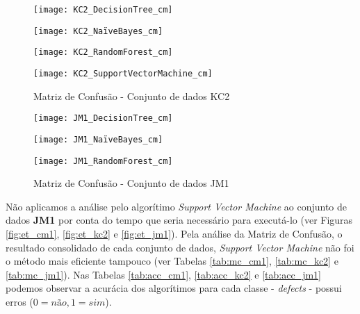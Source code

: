 \documentclass[10pt]{article}
\begin{document}
    \begin{figure}
        \centering
        \begin{minipage}{0.25\textwidth}
            \centering
            \texttt{[image: KC2\_DecisionTree\_cm]}
        \end{minipage}\hfill
        \begin{minipage}{0.25\textwidth}
            \centering
            \texttt{[image: KC2\_NaïveBayes\_cm]}
        \end{minipage}\hfill
        \begin{minipage}{0.25\textwidth}
            \centering
            \texttt{[image: KC2\_RandomForest\_cm]}
        \end{minipage}\hfill
        \begin{minipage}{0.25\textwidth}
            \centering
            \texttt{[image: KC2\_SupportVectorMachine\_cm]}
        \end{minipage}\hfill
        \caption{Matriz de Confusão - Conjunto de dados KC2}\label{fig:mc_kc2}
    \end{figure}

    \begin{figure}
        \centering
        \begin{minipage}{0.25\textwidth}
            \centering
            \texttt{[image: JM1\_DecisionTree\_cm]}
        \end{minipage}\hfill
        \begin{minipage}{0.25\textwidth}
            \centering
            \texttt{[image: JM1\_NaïveBayes\_cm]}
        \end{minipage}\hfill
        \begin{minipage}{0.25\textwidth}
            \centering
            \texttt{[image: JM1\_RandomForest\_cm]}
        \end{minipage}\hfill
        \begin{minipage}{0.25\textwidth}
            \hspace{\fill}
        \end{minipage}\hfill
        \caption{Matriz de Confusão - Conjunto de dados JM1}\label{fig:mc_jm1}
    \end{figure}

    Não aplicamos a análise pelo algorítimo \textit{Support Vector Machine} ao conjunto de dados \textbf{JM1} por conta do tempo que seria necessário para executá-lo (ver Figuras \ref{fig:et_cm1}, \ref{fig:et_kc2} e \ref{fig:et_jm1}). Pela análise da Matriz de Confusão, o resultado consolidado de cada conjunto de dados, \textit{Support Vector Machine} não foi o método mais eficiente tampouco (ver Tabelas \ref{tab:mc_cm1}, \ref{tab:mc_kc2} e \ref{tab:mc_jm1}). Nas Tabelas \ref{tab:acc_cm1}, \ref{tab:acc_kc2} e \ref{tab:acc_jm1} podemos observar a acurácia dos algorítimos para cada classe - \textit{defects} - possui erros ($0 = \textit{não}, 1 = \textit{sim}$).
\end{document}
